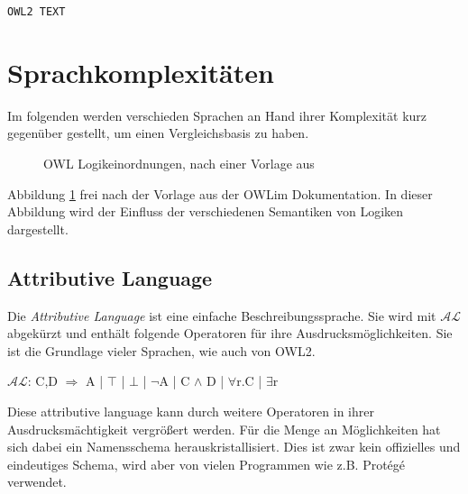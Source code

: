 \begin{verbatim}
OWL2 TEXT
\end{verbatim}


\section{Sprachkomplexitäten}
Im folgenden werden verschieden Sprachen an Hand ihrer Komplexität kurz gegenüber gestellt, um einen Vergleichsbasis zu haben.

\begin{figure}[htb]
	\caption{OWL Logikeinordnungen, nach einer Vorlage aus \cite{OWLimLayerMap}}
	\label{image-owl-layer-map}
	\begin{center}
	\end{center}
\end{figure}
Abbildung \ref{image-owl-layer-map} frei nach der Vorlage aus der OWLim Dokumentation. In dieser Abbildung wird der Einfluss der verschiedenen Semantiken von Logiken dargestellt.

\subsection{Attributive Language}
Die \emph{Attributive Language} ist eine einfache Beschreibungssprache. Sie wird mit $\mathcal{AL}$ abgekürzt und enthält folgende Operatoren für ihre Ausdrucksmöglichkeiten. Sie ist die Grundlage vieler Sprachen, wie auch von OWL2.

$\mathcal{AL}$: C,D $\Longrightarrow$ A | $\top$ | $\bot$ | $\lnot$A | C $\land$ D | $\forall$r.C | $\exists$r

Diese attributive language kann durch weitere Operatoren in ihrer Ausdrucksmächtigkeit vergrößert werden. Für die Menge an Möglichkeiten hat sich dabei ein Namensschema herauskristallisiert. Dies ist zwar kein offizielles und eindeutiges Schema, wird aber von vielen Programmen wie z.B. Protégé verwendet.

